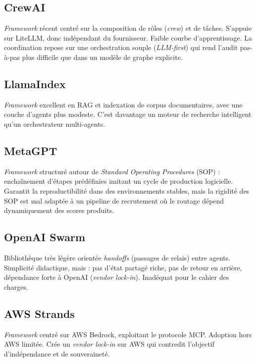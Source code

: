 \subsection{CrewAI}

\emph{Framework} récent \cite{crewai} centré sur la composition de rôles (\emph{crew}) et de tâches. S'appuie sur LiteLLM, donc indépendant du fournisseur. Faible courbe d'apprentissage. La coordination repose sur une orchestration souple (\emph{LLM-first}) qui rend l'audit pas-à-pas plus difficile que dans un modèle de graphe explicite.

\subsection{LlamaIndex}

\emph{Framework} \cite{llamaindex} excellent en RAG et indexation de corpus documentaires, avec une couche d'agents plus modeste. C'est davantage un moteur de recherche intelligent qu'un orchestrateur multi-agents.

\subsection{MetaGPT}

\emph{Framework} structuré autour de \emph{Standard Operating Procedures} (SOP) : enchaînement d'étapes prédéfinies imitant un cycle de production logicielle. Garantit la reproductibilité dans des environnements stables, mais la rigidité des SOP est mal adaptée à un pipeline de recrutement où le routage dépend dynamiquement des scores produits.

\subsection{OpenAI Swarm}

Bibliothèque très légère orientée \emph{handoffs} (passages de relais) entre agents. Simplicité didactique, mais : pas d'état partagé riche, pas de retour en arrière, dépendance forte à OpenAI (\emph{vendor lock-in}). Inadéquat pour le cahier des charges.

\subsection{AWS Strands}

\emph{Framework} centré sur AWS Bedrock, exploitant le protocole MCP. Adoption hors AWS limitée. Crée un \emph{vendor lock-in} sur AWS qui contredit l'objectif d'indépendance et de souveraineté.


